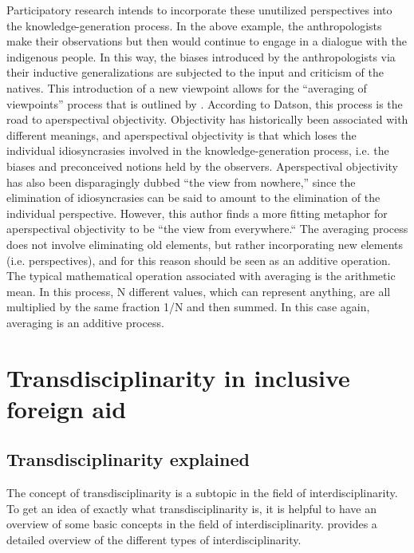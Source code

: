 \documentclass[a4paper]{article}
\begin{document}
Participatory research intends to incorporate these unutilized perspectives
into the knowledge-generation process. In the above example, the
anthropologists make their observations but then would continue to engage in a
dialogue with the indigenous people. In this way, the biases introduced by the
anthropologists via their inductive generalizations are subjected to the input
and criticism of the natives. This introduction of a new viewpoint allows for
the ``averaging of viewpoints'' process that is outlined by
\cite{datson1992objectivity}. According to Datson, this process is the road to
aperspectival objectivity. Objectivity has historically been associated with
different meanings, and aperspectival objectivity is that which
loses the individual idiosyncrasies involved in the knowledge-generation
process, i.e. the biases and preconceived notions held by the observers.
Aperspectival objectivity has also been disparagingly dubbed ``the view from
nowhere,'' since the elimination of idiosyncrasies can be said to amount to
the elimination of the individual perspective. However, this author finds a
more fitting metaphor for aperspectival objectivity to be ``the view from
everywhere.`` The averaging process does not involve eliminating old elements,
but rather incorporating new elements (i.e.  perspectives), and for this
reason should be seen as an additive operation.  The typical mathematical
operation associated with averaging is the arithmetic mean. In this process, N
different values, which can represent anything, are all multiplied by the same
fraction 1/N and then summed. In this case again, averaging is an additive
process.

\newpage

\section{Transdisciplinarity in inclusive foreign aid}

\subsection{Transdisciplinarity explained}

The concept of transdisciplinarity is a subtopic in the field of
interdisciplinarity. To get an idea of exactly what transdisciplinarity is, it
is helpful to have an overview of some basic concepts in the field of
interdisciplinarity. \cite{klein2010taxonomy} provides a detailed overview of
the different types of interdisciplinarity.
\end{document}
